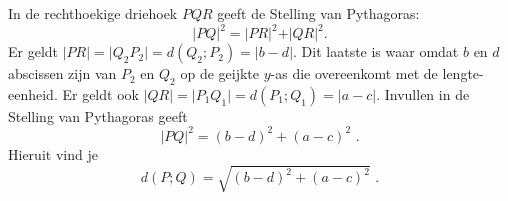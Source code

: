 

In de rechthoekige driehoek $PQR$ geeft de Stelling van Pythagoras:
\[
\vert PQ \vert ^2= \vert PR \vert ^2+ \vert QR \vert ^2 \text {.}
\]
Er geldt $\vert PR \vert = \vert Q_2P_2 \vert = d(Q_2;P_2)=\vert b-d \vert$.
Dit laatste is waar omdat $b$ en $d$ abscissen zijn van $P_2$ en $Q_2$ op de geijkte $y$-as die overeenkomt met de lengte-eenheid.
Er geldt ook $\vert QR \vert = \vert P_1Q_1 \vert = d(P_1;Q_1)=\vert a-c \vert$.
Invullen in de Stelling van Pythagoras geeft
\[
\vert PQ \vert ^2=(b-d)^2+(a-c)^2 \text{ .}
\]
Hieruit vind je
\[
d(P;Q)=\sqrt{(b-d)^2+(a-c)^2} \text { .}
\]\vspace{2mm}

